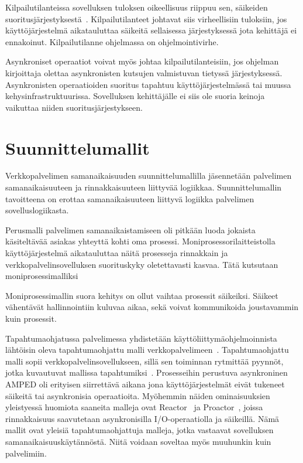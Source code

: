 \documentclass[finnish]{tktltiki2}
\theoremstyle{definition}
\theoremstyle{remark}
\begin{document}
Kilpailutilanteissa sovelluksen tuloksen oikeellisuus riippuu sen,
säikeiden suoritusjärjestyksestä~\cite{stallings_operating_2018}.
Kilpailutilanteet johtavat siis
virheellisiin tuloksiin, jos käyttöjärjestelmä aikatauluttaa
säikeitä sellaisessa järjestyksessä jota kehittäjä ei ennakoinut.
Kilpailutilanne ohjelmassa on ohjelmointivirhe.

Asynkroniset operaatiot voivat myös johtaa kilpailutilanteisiin,
jos ohjelman kirjoittaja olettaa asynkronisten kutsujen
valmistuvan tietyssä järjestyksessä. Asynkronisten operaatioiden
suoritus tapahtuu käyttöjärjestelmässä tai muussa kehysinfrastruktuurissa.
Sovelluksen kehittäjälle ei siis ole suoria keinoja vaikuttaa
niiden suoritusjärjestykseen.

\section{Suunnittelumallit}\label{sec:SM}

Verkkopalvelimen samanaikaisuuden suunnittelumallilla
jäsennetään palvelimen samanaikaisuuteen ja rinnakkaisuuteen
liittyvää logiikkaa. Suunnittelumallin tavoitteena on
erottaa samanaikaisuuteen liittyvä logiikka 
palvelimen sovelluslogiikasta.

Perusmalli palvelimen samanaikaistamiseen oli pitkään
luoda jokaista käsiteltävää asiakas yhteyttä kohti
oma prosessi. Moniprosessorilaitteistolla käyttöjärjestelmä
aikatauluttaa näitä prosesseja rinnakkain ja verkkopalvelinsovelluksen
suorituskyky oletettavasti kasvaa. Tätä kutsutaan moniprosessimalliksi

Moniprosessimallin suora kehitys on ollut vaihtaa prosessit säikeiksi.
Säikeet vähentävät hallinnointiin kuluvaa aikaa, sekä
voivat kommunikoida joustavammin kuin prosessit.

Tapahtumaohjatussa palvelimessa yhdistetään
käyttöliittymäohjelmoinnista lähtöisin oleva tapahtumaohjattu malli
verkkopalvelimeen~\cite{pai_flash:_1999}. Tapahtumaohjattu malli sopii verkkopalvelinsovellukseen,
sillä sen toiminnan rytmittää pyynnöt, jotka
kuvautuvat mallissa tapahtumiksi~\cite{schmidt_reactor:_1995}.
Prosesseihin perustuva asynkroninen AMPED\cite{pai_flash:_1999}
oli erityisen siirrettävä aikana jona käyttöjärjestelmät
eivät tukeneet säikeitä tai asynkronisia operaatioita.
Myöhemmin näiden ominaisuuksien yleistyessä
huomiota saaneita malleja ovat Reactor~\cite{schmidt_reactor:_1995}
ja Proactor~\cite{pyarali_proactor_1997}, joissa
rinnakkaisuus saavutetaan asynkronisilla I/O-operaatiolla
ja säikeillä. Nämä mallit ovat yleisiä tapahtumaohjattuja malleja, jotka
vastaavat sovelluksen samanaikaisuuskäytännöstä.
Niitä voidaan soveltaa myös muuhunkin kuin palvelimiin.
\end{document}
